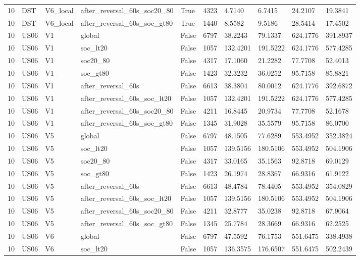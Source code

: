 \begin{tabular}{llllllllll}
10 & DST & V6\_local & after\_reversal\_60s\_soc20\_80 & True & 4323 & 4.7140 & 6.7415 & 24.2107 & 19.3841 \\
10 & DST & V6\_local & after\_reversal\_60s\_soc\_gt80 & True & 1440 & 8.5582 & 9.5186 & 28.5414 & 17.4502 \\
10 & US06 & V1 & global & False & 6797 & 38.2243 & 79.1337 & 624.1776 & 391.8937 \\
10 & US06 & V1 & soc\_lt20 & False & 1057 & 132.4201 & 191.5222 & 624.1776 & 577.4285 \\
10 & US06 & V1 & soc20\_80 & False & 4317 & 17.1060 & 21.2282 & 77.7708 & 52.4013 \\
10 & US06 & V1 & soc\_gt80 & False & 1423 & 32.3232 & 36.0252 & 95.7158 & 85.8821 \\
10 & US06 & V1 & after\_reversal\_60s & False & 6613 & 38.3804 & 80.0012 & 624.1776 & 392.6872 \\
10 & US06 & V1 & after\_reversal\_60s\_soc\_lt20 & False & 1057 & 132.4201 & 191.5222 & 624.1776 & 577.4285 \\
10 & US06 & V1 & after\_reversal\_60s\_soc20\_80 & False & 4211 & 16.8445 & 20.9734 & 77.7708 & 52.1678 \\
10 & US06 & V1 & after\_reversal\_60s\_soc\_gt80 & False & 1345 & 31.9028 & 35.5579 & 95.7158 & 86.0700 \\
10 & US06 & V5 & global & False & 6797 & 48.1505 & 77.6289 & 553.4952 & 352.3824 \\
10 & US06 & V5 & soc\_lt20 & False & 1057 & 139.5156 & 180.5106 & 553.4952 & 504.1906 \\
10 & US06 & V5 & soc20\_80 & False & 4317 & 33.0165 & 35.1563 & 92.8718 & 69.0129 \\
10 & US06 & V5 & soc\_gt80 & False & 1423 & 26.1974 & 28.8367 & 66.9316 & 61.9122 \\
10 & US06 & V5 & after\_reversal\_60s & False & 6613 & 48.4784 & 78.4405 & 553.4952 & 354.0829 \\
10 & US06 & V5 & after\_reversal\_60s\_soc\_lt20 & False & 1057 & 139.5156 & 180.5106 & 553.4952 & 504.1906 \\
10 & US06 & V5 & after\_reversal\_60s\_soc20\_80 & False & 4211 & 32.8777 & 35.0238 & 92.8718 & 67.9064 \\
10 & US06 & V5 & after\_reversal\_60s\_soc\_gt80 & False & 1345 & 25.7784 & 28.3669 & 66.9316 & 62.2525 \\
10 & US06 & V6 & global & False & 6797 & 47.5592 & 76.1753 & 551.6475 & 338.4938 \\
10 & US06 & V6 & soc\_lt20 & False & 1057 & 136.3575 & 176.6507 & 551.6475 & 502.2439 \\

\end{tabular}

